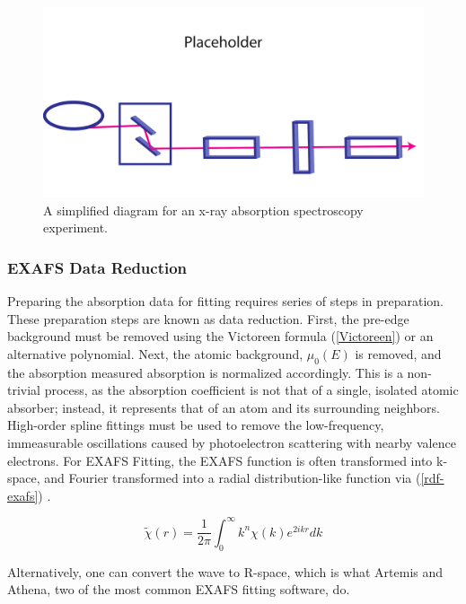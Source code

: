 \begin{figure}
    \centering
    \includegraphics[width=\linewidth]{Chapters/Figures/synchrotron-diagram.pdf}
    \caption[Example XAFS Experiment Setup]{A simplified diagram for an x-ray absorption spectroscopy experiment.}
    \label{fig:xafs-setup}
\end{figure}

\subsubsection{EXAFS Data Reduction}
Preparing the absorption data for fitting requires series of steps in preparation. These preparation steps are known as data reduction. First, the pre-edge background must be removed using the Victoreen formula (\ref{Victoreen}) or an alternative polynomial. Next, the atomic background, $ \mu_0(E) $  is removed, and the absorption measured absorption is normalized accordingly. This is a non-trivial process, as the absorption coefficient is not that of a single, isolated atomic absorber; instead, it represents that of an atom and its surrounding neighbors. High-order spline fittings must be used to remove the low-frequency, immeasurable oscillations caused by photoelectron scattering with nearby valence electrons. For EXAFS Fitting, the EXAFS function is often transformed into k-space, and Fourier transformed into a radial distribution-like function via (\ref{rdf-exafs}) \cite{exafsbook}.

\begin{equation}
    \label{rdf-exafs}
    \widetilde{\chi}(r) = \frac{1}{2\pi} \int_{0}^{\infty }  k^n \chi(k) e^{2ikr} dk
\end{equation}

Alternatively, one can convert the wave to R-space, which is what Artemis and Athena, two of the most common EXAFS fitting software, do.

